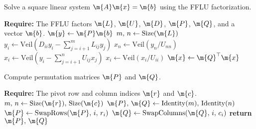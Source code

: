 \begin{breakablealgorithm}
  \caption{Solve a square linear system $\m{A}\m{x} = \m{b}$ using the \ac{FFLU} factorization.}
  \label{chap3:alg:solve_fflu}
  \begin{algorithmic}[1]
    \State \textbf{Require:} The \ac{FFLU} factors $\m{L}$, $\m{U}$, $\m{D}$, $\m{P}$, $\m{Q}$, and a vector $\m{b}$.
     
    \State $\m{y} \gets \m{P}\m{b}$ 
    \State $m, \, n \gets \mathrm{Size}(\m{L})$ 
     
      \State $y_i \gets \mathrm{Veil}\left(D_{ii}y_{i} - {\displaystyle\sum_{j=i+1}^{m}} L_{ij}y_j\right)$ 
    \EndFor
    \State $x_n \gets \mathrm{Veil}(y_n/U_{nn})$ 
     
      \State $x_i \gets \mathrm{Veil}\left(y_i - {\displaystyle\sum_{j=i+1}^{n}} U_{ij}x_j\right)$ 
      \State $x_i \gets \mathrm{Veil}(x_i/U_{ii})$
    \EndFor
    \State $\m{x} \gets \m{Q}^\top\m{x}$ 
    \EndProcedure
  \end{algorithmic}
\end{breakablealgorithm}

\begin{breakablealgorithm}
  \caption{Compute permutation matrices $\m{P}$ and $\m{Q}$.}
  \label{chap3:alg:permutation_matrices}
  \begin{algorithmic}[1]
    \State \textbf{Require:} The pivot row and column indices $\m{r}$ and $\m{c}$.
     
    \State $m, \, n \gets \mathrm{Size}(\m{r}), \, \mathrm{Size}(\m{c})$ 
    \State $\m{P}, \, \m{Q} \gets \mathrm{Identity}(m), \, \mathrm{Identity}(n)$ 
     
      \State $\m{P} \gets \mathrm{SwapRows}(\m{P}, \, i, \, r_i)$ 
    \EndFor
     
      \State $\m{Q} \gets \mathrm{SwapColumns}(\m{Q}, \, i, \, c_i)$ 
    \EndFor
    \State \textbf{return} $\m{P}, \, \m{Q}$ 
    \EndProcedure
  \end{algorithmic}
\end{breakablealgorithm}

